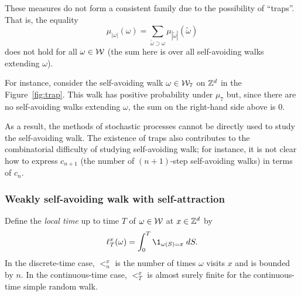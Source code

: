 These measures do not form a consistent family due to the possibility of ``traps''.
That is, the equality
\begin{equation}
\mu_{|\omega|}(\omega) = \sum_{\tilde\omega \supset \omega} \mu_{|\tilde\omega|}(\tilde\omega)
\end{equation}
does not hold for all $\omega\in\mathcal{W}$ (the sum here is over all self-avoiding walks extending
$\omega$).


For instance, consider the self-avoiding walk $\omega\in\mathcal{W}_7$ on ${ {{\mathbb Z}}^d }$ in the Figure~\ref{fig:trap}.
This walk has positive probability under $\mu_7$ but,
since there are no self-avoiding walks extending $\omega$, the sum on the right-hand side
above is $0$.

As a result, the methods of stochastic processes cannot be directly used to study the self-avoiding
walk. The existence of traps also contributes to the combinatorial difficulty of studying
self-avoiding walk; for instance, it is not clear how to express $c_{n+1}$ (the number of
$(n+1)$-step self-avoiding walks) in terms of $c_n$.



\subsubsection{Weakly self-avoiding walk with self-attraction}

Define the \emph{local time} up to time $T$ of $\omega \in \mathcal{W}$ at $x \in { {{\mathbb Z}}^d }$ by
\begin{equation}
\lt^x_T(\omega) = \int_0^T \1_{\omega(S)=x} \; dS.
\end{equation}
In the discrete-time case, $\lt^x_n$ is the number of times $\omega$ visits $x$
and is bounded by $n$. In the continuous-time case, $\lt^x_T$ is almost surely
finite for the continuous-time simple random walk.

